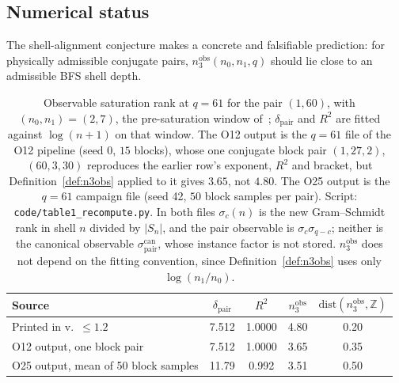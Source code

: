 \documentclass[11pt,a4paper]{article}
\theoremstyle{definition}
\theoremstyle{remark}
\begin{document}
  \subsection{Numerical status}

    The shell-alignment conjecture makes a concrete and
    falsifiable prediction: for physically admissible conjugate
    pairs, $n_3^{\mathrm{obs}}(n_0, n_1, q)$ should lie close
    to an admissible BFS shell depth.

    \begin{table}[ht]
      \centering
      \small
      \setlength{\tabcolsep}{4pt}
      \begin{tabular}{lcccc}
        \hline
        Source & $\delta_{\mathrm{pair}}$ & $R^2$ &
        $n_3^{\mathrm{obs}}$ &
        $\mathrm{dist}(n_3^{\mathrm{obs}}, \mathbb{Z})$ \\
        \hline
        Printed in v.~$\leq1.2$ & 7.512 & 1.0000 & 4.80 & 0.20 \\
        O12 output, one block pair & 7.512 & 1.0000 & 3.65 & 0.35 \\
        O25 output, mean of 50 block samples & 11.79 & 0.992 & 3.51 & 0.50 \\
        \hline
      \end{tabular}
      \caption{Observable saturation rank at $q=61$ for the pair $(1,60)$, with $(n_0, n_1) = (2, 7)$, the
        pre-saturation window of~\cite{Beau2026a17}; $\delta_{\mathrm{pair}}$ and $R^2$ are fitted against
        $\log(n+1)$ on that window.
        The O12 output is the $q=61$ file of the O12 pipeline (seed 0, $15$ blocks), whose one conjugate block pair
        $(1,27,2)$, $(60,3,30)$ reproduces the earlier row's exponent, $R^2$ and bracket, but Definition~\ref{def:n3obs} applied to it gives $3.65$, not $4.80$.
        The O25 output is the $q=61$ campaign file (seed 42, $50$ block samples per pair).
        Script: \texttt{code/table1\_recompute.py}.
        In both files $\sigma_c(n)$ is the new Gram--Schmidt rank in shell $n$ divided by $|S_n|$, and the pair
        observable is $\sigma_c\sigma_{q-c}$; neither is the canonical observable
        $\sigma_{\mathrm{pair}}^{\mathrm{can}}$, whose instance factor is not stored.
        $n_3^{\mathrm{obs}}$ does not depend on the fitting convention, since Definition~\ref{def:n3obs} uses
        only $\log(n_1/n_0)$.}
      \label{tab:n3obs}
    \end{table}
\end{document}

